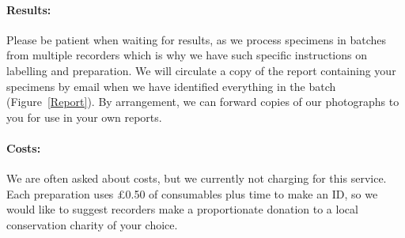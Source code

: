 \documentclass[12pt]{article}
\begin{document}
\paragraph{Results:}Please be patient when waiting for results, as we process specimens in batches from multiple recorders which is why we have such specific instructions on labelling and preparation. We will circulate a copy of the report containing your specimens by email when we have identified everything in the batch (Figure~\ref{Report}). By arrangement, we can forward copies of our photographs to you for use in your own reports.

\paragraph{Costs:}We are often asked about costs, but we currently not charging for this service.  Each preparation uses \pounds 0.50 of consumables plus time to make an ID, so we would like to suggest recorders make a proportionate donation to a local conservation charity of your choice. 

\end{document}
